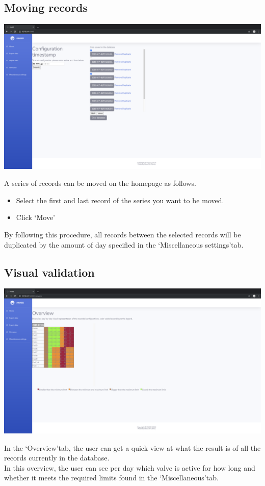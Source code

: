 \documentclass[12pt]{article}
\begin{document}
\subsection{Moving records}
\begin{center}
	\includegraphics[width=\linewidth]{images/Move_entries.png}
\end{center}
A series of records can be moved on the homepage as follows.
\begin{itemize}
	\item Select the first  and last record of the series you want to be moved.
	\item Click \lq Move\rq
\end{itemize}
By following this procedure, all records between the selected records will be duplicated by the amount of day specified in the \lq Miscellaneous settings\rq tab.

\subsection{Visual validation}
\begin{center}
	\includegraphics[width=\linewidth]{images/Overview.png}
\end{center}
In the \lq Overview\rq tab, the user can get a quick view at what the result is of all the records currently in the database.\\
In this overview, the user can see per day which valve is active for how long and whether it meets the required limits found in the \lq Miscellaneous\rq tab.\\
\end{document}
